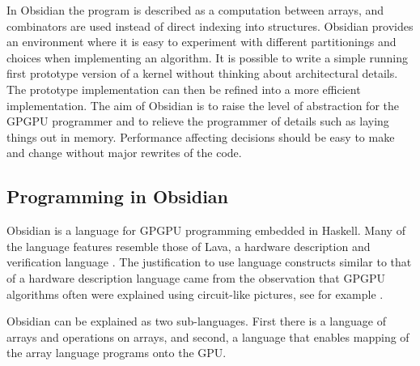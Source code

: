 In Obsidian the program is described as 
a computation between arrays, and combinators are used instead of direct indexing 
into structures. 
Obsidian provides an environment where it is easy to experiment with different
partitionings and choices when implementing an algorithm. It is 
possible to write a simple running first prototype version of a kernel 
without thinking about architectural details. The prototype implementation 
can then be refined into a more efficient implementation. 
The aim of Obsidian is to raise the level of abstraction for the GPGPU 
programmer and to relieve the programmer of details such as laying things out 
in memory. Performance affecting decisions should be easy to make 
and change without major rewrites of the code.



\subsection{Programming in Obsidian} 

Obsidian is a language for GPGPU programming embedded in Haskell. Many of 
the language features resemble those of Lava, a hardware description and 
verification language \cite{lavaICFP}. The justification to use language 
constructs similar to that of a hardware description language came from 
the observation that GPGPU algorithms often were explained using circuit-like 
pictures, see for example \cite{GEMS3}. 


Obsidian can be explained as two sub-languages. First there is a language of 
arrays and operations on arrays, and second, a language that enables mapping of the 
array language programs onto the GPU. 
 
